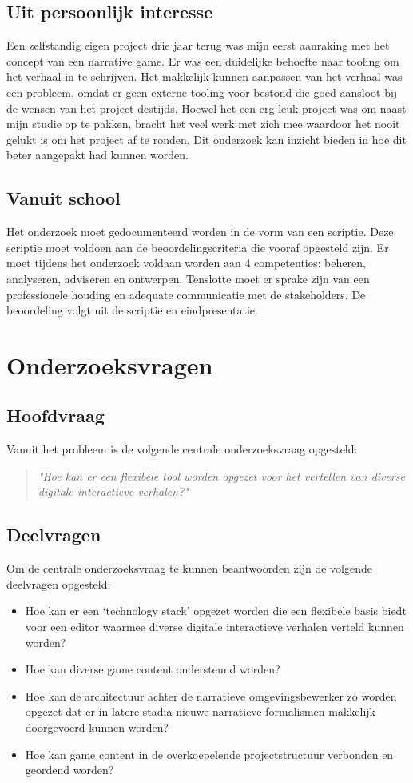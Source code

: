 \subsection{Uit persoonlijk interesse}
Een zelfstandig eigen project drie jaar terug was mijn eerst aanraking met het concept van een narrative game. Er was een duidelijke behoefte naar tooling om het verhaal in te schrijven. Het makkelijk kunnen aanpassen van het verhaal was een probleem, omdat er geen externe tooling voor bestond die goed aansloot bij de wensen van het project destijds. Hoewel het een erg leuk project was om naast mijn studie op te pakken, bracht het veel werk met zich mee waardoor het nooit gelukt is om het project af te ronden. Dit onderzoek kan inzicht bieden in hoe dit beter aangepakt had kunnen worden.

\subsection{Vanuit school}
Het onderzoek moet gedocumenteerd worden in de vorm van een scriptie. Deze scriptie moet voldoen aan de beoordelingscriteria die vooraf opgesteld zijn. Er moet tijdens het onderzoek voldaan worden aan 4 competenties: beheren, analyseren, adviseren en ontwerpen. Tenslotte moet er sprake zijn van een professionele houding en adequate communicatie met de stakeholders. De beoordeling volgt uit de scriptie en eindpresentatie.


\section{Onderzoeksvragen}
\subsection{Hoofdvraag}
Vanuit het probleem is de volgende centrale onderzoeksvraag opgesteld:
\begin{quote} 
    \centering
    \large
    \textit{
        "Hoe kan er een flexibele tool worden opgezet voor het vertellen van diverse digitale interactieve verhalen?"
    }
\end{quote}

\subsection{Deelvragen}
Om de centrale onderzoeksvraag te kunnen beantwoorden zijn de volgende deelvragen opgesteld:
\begin{itemize}
    \item Hoe kan er een ‘technology stack’ opgezet worden die een flexibele basis biedt voor een editor waarmee diverse digitale interactieve verhalen verteld kunnen worden?
    \item Hoe kan diverse game content ondersteund worden?
    \item Hoe kan de architectuur achter de narratieve omgevingsbewerker zo worden opgezet dat er in latere stadia nieuwe narratieve formalismen makkelijk doorgevoerd kunnen worden?
    \item Hoe kan game content in de overkoepelende projectstructuur verbonden en geordend worden?
\end{itemize}

